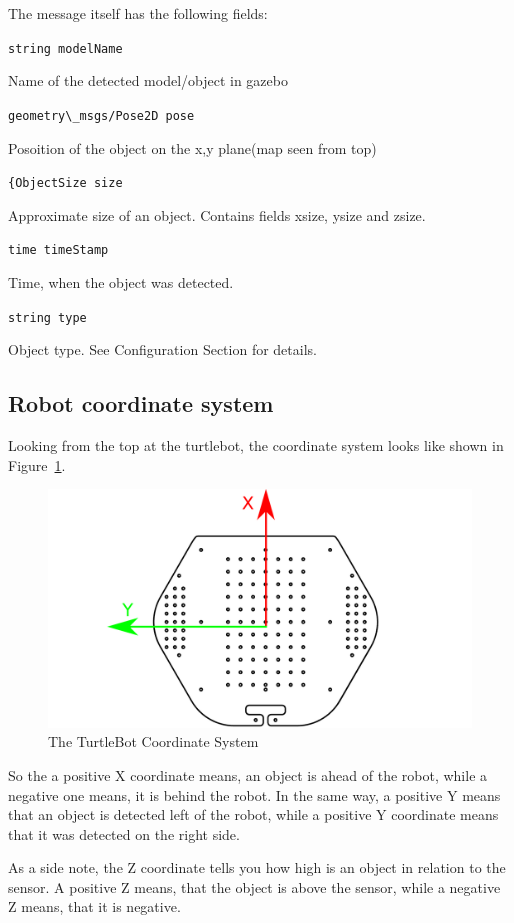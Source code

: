 The message itself has the following fields:

\verb$string modelName$

Name of the detected model/object in gazebo

\verb$geometry\_msgs/Pose2D pose$

Posoition of the object on the x,y plane(map seen from top)

\verb${ObjectSize size$

Approximate size of an object. Contains fields xsize, ysize and zsize.

\verb$time timeStamp$

Time, when the object was detected.

\verb$string type$

Object type. See Configuration Section for details.

\subsection{Robot coordinate system}

Looking from the top at the turtlebot, the coordinate system looks like shown in Figure~\ref{fig:TurtleBotCoordinates}.
\begin{figure}[htbp]
  \includegraphics[width=1.0\textwidth]{ttbtop.pdf} 
  \caption{The TurtleBot Coordinate System}
  \label{fig:TurtleBotCoordinates}
\end{figure}

So the a positive X coordinate means, an object is ahead of the robot, while a negative one means, it is behind the robot. In the same way, a positive Y means that an object is detected left of the robot, while a positive Y coordinate means that it was detected on the right side.

As a side note, the Z coordinate tells you how high is an object in relation to the sensor. A positive Z means, that the object is above the sensor, while a negative Z means, that it is negative.

